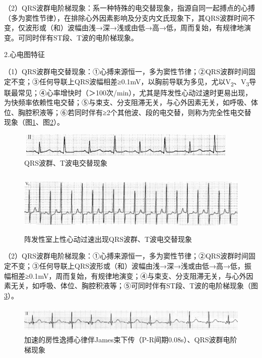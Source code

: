 （2）QRS波群电阶梯现象：系一种特殊的电交替现象，指源自同一起搏点的心搏（多为窦性节律），在排除心外因素影响及分支内文氏现象下，其QRS波群时间不变，仅波形或（和）波幅由浅→深→浅或由低→高→低，周而复始，有规律地演变。可同时伴有ST段、T波的电阶梯现象。

2.心电图特征

（1）QRS波群电交替现象：①心搏来源恒一，多为窦性节律；②QRS波群时间固定不变；③任何导联上QRS波幅相差≥0.1mV，以胸前导联为多见，尤以V\textsubscript{2}、V\textsubscript{3}导联最常见；④心率增快时（＞100次/min），尤其是阵发性心动过速时更易出现，为快频率依赖性电交替；⑤与束支、分支阻滞无关，与心外因素无关，如呼吸、体位、胸腔积液等；⑥若同时伴有≥2个其他波、段的电交替，则称为完全性电交替现象（图\ref{fig3-7}、图\ref{fig3-8}）。

\begin{figure}[!htbp]
 \centering
 \includegraphics[width=4.19792in,height=0.4375in]{./images/Image00056.jpg}
 \captionsetup{justification=centering}
 \caption{QRS波群、T波电交替现象}
 \label{fig3-7}
  \end{figure} 

\begin{figure}[!htbp]
 \centering
 \includegraphics[width=5.78125in,height=1.17708in]{./images/Image00057.jpg}
 \captionsetup{justification=centering}
 \caption{阵发性室上性心动过速出现QRS波群、T波电交替现象}
 \label{fig3-8}
  \end{figure} 

（2）QRS波群电阶梯现象：①心搏来源恒一，多为窦性节律；②QRS波群时间固定不变；③任何导联上QRS波形或（和）波幅由浅→深→浅或由低→高→低，振幅相差≥0.1mV，周而复始，有规律地演变；④与束支、分支阻滞无关，与心外因素无关，如呼吸、体位、胸腔积液等；⑤可同时伴有ST段、T波的电阶梯现象（图\ref{fig3-9}）。

\begin{figure}[!htbp]
 \centering
 \includegraphics[width=5.78125in,height=0.51042in]{./images/Image00058.jpg}
 \captionsetup{justification=centering}
 \caption{加速的房性逸搏心律伴James束下传（P-R间期0.08s）、QRS波群电阶梯现象}
 \label{fig3-9}
  \end{figure} 

